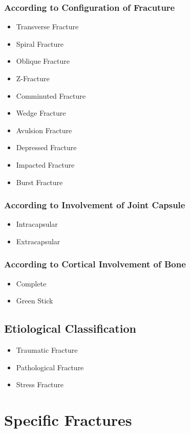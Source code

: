 \documentclass[11pt, a4paper]{article}
\begin{document}
\subsubsection{According to Configuration of Fracuture}
\begin{itemize}
    \item Transverse Fracture
    \item Spiral Fracture
    \item Oblique Fracture
    \item Z-Fracture
    \item Comminuted Fracture
    \item Wedge Fracture
    \item Avulsion Fracture
    \item Depressed Fracture
    \item Impacted Fracture
    \item Burst Fracture
\end{itemize}
\subsubsection{According to Involvement of Joint Capsule}
\begin{itemize}
    \item Intracapsular
    \item Extracapsular
\end{itemize}
\subsubsection{According to Cortical Involvement of Bone}
\begin{itemize}
    \item Complete
    \item Green Stick
\end{itemize}
\subsection{Etiological Classification}
\begin{itemize}
    \item Traumatic Fracture
    \item Pathological Fracture
    \item Stress Fracture
\end{itemize}
\section{Specific Fractures}
\end{document}
